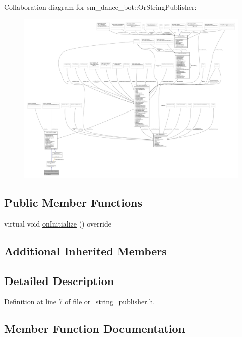 Collaboration diagram for sm\+\_\+dance\+\_\+bot\+:\+:Or\+String\+Publisher\+:
\nopagebreak
\begin{figure}[H]
\begin{center}
\leavevmode
\includegraphics[width=350pt]{classsm__dance__bot_1_1OrStringPublisher__coll__graph}
\end{center}
\end{figure}
\subsection*{Public Member Functions}
\begin{DoxyCompactItemize}
\item 
virtual void \hyperlink{classsm__dance__bot_1_1OrStringPublisher_a61cf6dcd0726eb1191dd0a110237968e}{on\+Initialize} () override
\end{DoxyCompactItemize}
\subsection*{Additional Inherited Members}


\subsection{Detailed Description}


Definition at line 7 of file or\+\_\+string\+\_\+publisher.\+h.



\subsection{Member Function Documentation}
\mbox{\label{classsm__dance__bot_1_1OrStringPublisher_a61cf6dcd0726eb1191dd0a110237968e}} 
